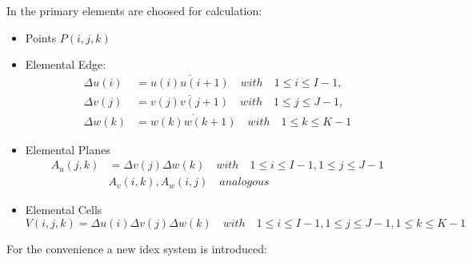In \cite{script_FeldSim} the primary elements are choosed for calculation:
\begin{itemize}
\item Points $P(i,j,k)$
\item Elemental Edge:
    \begin{align}
		\Delta u(i)&=\overline{u(i)u(i+1)}  \quad with  \quad 1\leq i \leq I-1, \nonumber\\
		\Delta v(j)&=\overline{v(j)v(j+1)}  \quad with  \quad 1\leq j \leq J-1, \nonumber\\
		\Delta w(k)&=\overline{w(k)w(k+1)}  \quad with  \quad 1\leq k \leq K-1
		\label{eq:discrete_edge}
		\end{align}
\item Elemental Planes
		\begin{align}
		A_{u}(j,k)&=\Delta v(j)\Delta w(k) \quad with  \quad 1\leq i \leq I-1,1\leq j \leq J-1\nonumber\\
		&A_{v}(i,k),A_{w}(i,j)  \quad analogous
		\label{eq:discrete_plane}
		\end{align}
\item Elemental Cells
		\begin{equation}
		V(i,j,k)=\Delta u(i)\Delta v(j)\Delta w(k)  \quad with  \quad 1\leq i\leq I-1,1\leq j\leq J-1,1\leq k\leq K-1
		\label{eq:discrete_cell}
		\end{equation}
\end{itemize}
For the convenience a new idex system is introduced:

